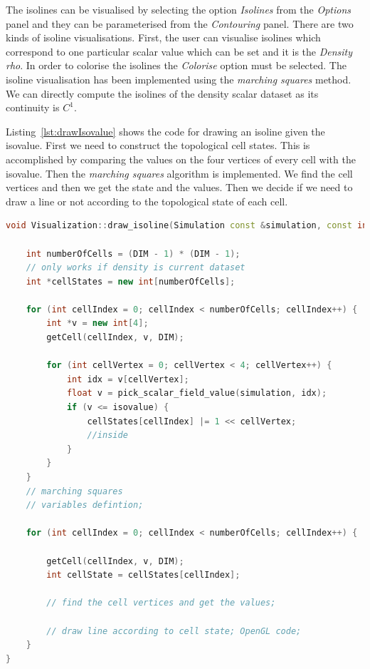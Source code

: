 
The isolines can be visualised by selecting the option \emph{Isolines} from the \emph{Options} panel and they can be parameterised from the \emph{Contouring} panel. There are two kinds of isoline visualisations. First, the user can visualise isolines which correspond to one particular scalar value which can be set and it is the \emph{Density rho}. In order to colorise the isolines the \emph{Colorise} option must be selected. The isoline visualisation has been implemented using the \emph{marching squares} method. We can directly compute the isolines of the density scalar dataset as its continuity is $C^1$. 

Listing~\ref{lst:drawIsovalue} shows the code for drawing an isoline given the isovalue. First we need to construct the topological cell states. This is accomplished by comparing the values on the four vertices of every cell with the isovalue. Then the \emph{marching squares} algorithm is implemented. We find the cell vertices and then we get the state and the values. Then we decide if we need to draw a line  or not according to the topological state of each cell.

\begin{lstlisting}[language=C++,label=lst:drawIsovalue,caption={Draw isoline given an isovalue.}]
void Visualization::draw_isoline(Simulation const &simulation, const int DIM, const fftw_real wn, const fftw_real hn, float isovalue) {

    int numberOfCells = (DIM - 1) * (DIM - 1);
    // only works if density is current dataset
    int *cellStates = new int[numberOfCells];

    for (int cellIndex = 0; cellIndex < numberOfCells; cellIndex++) {
        int *v = new int[4];
        getCell(cellIndex, v, DIM);

        for (int cellVertex = 0; cellVertex < 4; cellVertex++) {
            int idx = v[cellVertex];
            float v = pick_scalar_field_value(simulation, idx);
            if (v <= isovalue) {
                cellStates[cellIndex] |= 1 << cellVertex;
                //inside
            }
        }
    }
    // marching squares      
    // variables defintion;

    for (int cellIndex = 0; cellIndex < numberOfCells; cellIndex++) {
    
        getCell(cellIndex, v, DIM);
        int cellState = cellStates[cellIndex];

        // find the cell vertices and get the values;

        // draw line according to cell state; OpenGL code;
    }
}
\end{lstlisting}

